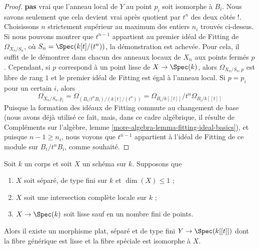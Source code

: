 \begin{proof}
{{\bf pas} vrai que l'anneau local de $Y$ au point
$p_i$ soit isomorphe à $B_i$. Nous savons seulement que cela devient vrai après
quotient par $t^n$ des deux côtés !}.
Choisissons $n$ strictement supérieur au maximum des entiers $n_i$ trouvés ci-dessus.
Si nous pouvons montrer que $t^{n - 1}$ appartient au premier idéal de Fitting de
$\Omega_{X_n/S_n}$, où $S_n = \Spec(k[t]/(t^n))$, la démonstration est achevée.
Pour cela, il suffit de le démontrer dans chacun
des anneaux locaux de $X_n$ aux points fermés $p$.
Cependant, si $p$ correspond à un point lisse de $X \to \Spec(k)$,
alors $\Omega_{X_n/S_n, p}$ est libre de rang $1$ et le premier idéal de Fitting
est égal à l'anneau local. Si $p = p_i$ pour un certain $i$, alors
$$
\Omega_{X_n/S_n, p_i} =
\Omega_{(B_i/t^nB_i)/(k[t]/(t^n))} =
\Omega_{B_i/k[[t]]}/t^n\Omega_{B_i/k[[t]]}
$$
Puisque la formation des idéaux de Fitting commute au changement de base
(nous avons déjà utilisé ce fait, mais, dans ce cadre algébrique,
il résulte de Compléments sur l'algèbre, lemme
\ref{more-algebra-lemma-fitting-ideal-basics}),
et puisque $n - 1 \geq n_i$, nous voyons que $t^{n - 1}$ appartient
à l'idéal de Fitting de ce module sur $B_i/t^nB_i$, comme souhaité.
\end{proof}

\begin{lemma}
\label{lemma-smoothing-curve-isolated-lci}
Soit $k$ un corps et soit $X$ un schéma sur $k$. Supposons que
\begin{enumerate}
\item $X$ soit séparé, de type fini sur $k$ et $\dim(X) \leq 1$ ;
\item $X$ soit une intersection complète locale sur $k$ ;
\item $X \to \Spec(k)$ soit lisse sauf en un nombre fini de points.
\end{enumerate}
Alors il existe un morphisme plat, séparé et de type fini $Y \to \Spec(k[[t]])$
dont la fibre générique est lisse et la fibre spéciale
est isomorphe à $X$.
\end{lemma}

